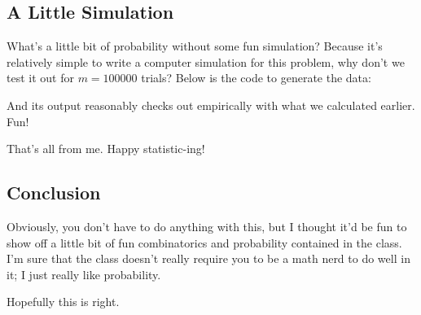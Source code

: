 \subsection{A Little Simulation}

What's a little bit of probability without some fun simulation? Because it's
relatively simple to write a computer simulation for this problem, why don't we
test it out for \( m = 100000 \) trials? Below is the code to generate the
data:

And its output reasonably checks out empirically with what we calculated
earlier. Fun!

That's all from me. Happy statistic-ing!

\subsection{Conclusion}

Obviously, you don't have to do anything with this, but I thought it'd be fun
to show off a little bit of fun combinatorics and probability contained in the
class. I'm sure that the class doesn't really require you to be a math nerd to
do well in it; I just really like probability.

Hopefully this is right.
